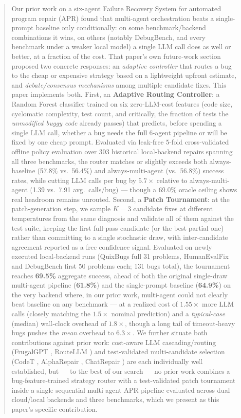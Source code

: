 \documentclass[conference]{IEEEtran}
\begin{document}
\begin{abstract}
Our prior work on a six-agent Failure Recovery System for automated program repair (APR) found that multi-agent orchestration beats a single-prompt baseline only conditionally: on some benchmark/backend combinations it wins, on others (notably DebugBench, and every benchmark under a weaker local model) a single LLM call does as well or better, at a fraction of the cost. That paper's own future-work section proposed two concrete responses: an \emph{adaptive controller} that routes a bug to the cheap or expensive strategy based on a lightweight upfront estimate, and \emph{debate/consensus mechanisms} among multiple candidate fixes. This paper implements both. First, an \textbf{Adaptive Routing Controller}: a Random Forest classifier trained on six zero-LLM-cost features (code size, cyclomatic complexity, test count, and critically, the fraction of tests the \emph{unmodified buggy code} already passes) that predicts, before spending a single LLM call, whether a bug needs the full 6-agent pipeline or will be fixed by one cheap prompt. Evaluated via leak-free 5-fold cross-validated offline policy evaluation over 303 historical local-backend repairs spanning all three benchmarks, the router matches or slightly exceeds both always-baseline (57.8\% vs.\ 56.4\%) and always-multi-agent (vs.\ 56.8\%) success rates, while cutting LLM calls per bug by $5.7\times$ relative to always-multi-agent (1.39 vs.\ 7.91 avg.\ calls/bug) — though a 69.0\% oracle ceiling shows real headroom remains unrouted. Second, a \textbf{Patch Tournament}: at the patch-generation step, we sample $K{=}3$ candidate fixes at different temperatures from the same diagnosis and validate all of them against the test suite, keeping the first full-pass candidate (or the best partial one) rather than committing to a single stochastic draw, with inter-candidate agreement reported as a free confidence signal. Evaluated on newly executed local-backend runs (QuixBugs full 31 problems, HumanEvalFix and DebugBench first 50 problems each; 131 bugs total), the tournament reaches \textbf{69.5\%} aggregate success, ahead of both the original single-draw multi-agent pipeline (\textbf{61.8\%}) and the single-prompt baseline (\textbf{64.9\%}) on the very backend where, in our prior work, multi-agent could not clearly beat baseline on any benchmark — at a realized cost of $1.55\times$ more LLM calls (closely matching the $1.5\times$ nominal prediction) and a \emph{typical-case} (median) wall-clock overhead of $1.8\times$, though a long tail of timeout-heavy bugs pushes the \emph{mean} overhead to $6.3\times$. We further situate both contributions against prior work: cost-aware LLM cascading/routing (FrugalGPT \cite{frugalgpt}, RouteLLM \cite{routellm}) and test-validated multi-candidate selection (CodeT \cite{codet}, AlphaRepair \cite{alpharepair}, ChatRepair \cite{chatrepair}) are each individually well established, but — to the best of our search — no prior work combines a bug-feature-trained strategy router with a test-validated patch tournament inside a single sequential multi-agent APR pipeline evaluated across dual cloud/local backends and three benchmarks, which we present as this paper's specific contribution.

\end{abstract}
\end{document}
